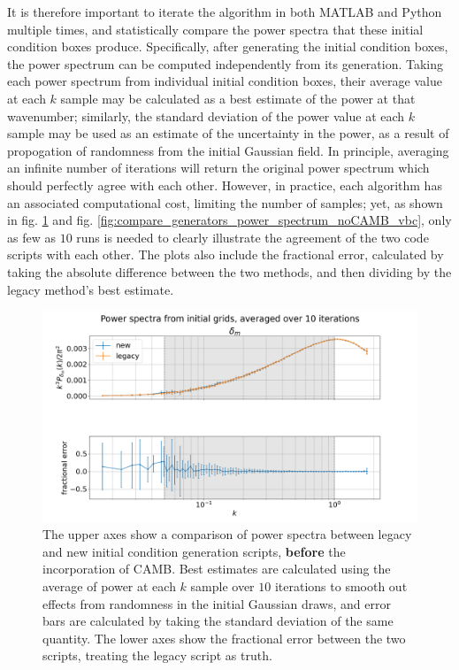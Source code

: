 \documentclass[floats,floatfix,showpacs,amssymb,prd,superscriptaddress,nofootinbib]{revtex4-2} %
\begin{document}
It is therefore important to iterate the algorithm in both MATLAB and Python multiple times, and statistically compare the power spectra that these initial condition boxes produce. Specifically, after generating the initial condition boxes, the power spectrum can be computed independently from its generation. Taking each power spectrum from individual initial condition boxes, their average value at each $k$ sample may be calculated as a best estimate of the power at that wavenumber; similarly, the standard deviation of the power value at each $k$ sample may be used as an estimate of the uncertainty in the power, as a result of propogation of randomness from the initial Gaussian field. In principle, averaging an infinite number of iterations will return the original power spectrum which should perfectly agree with each other. However, in practice, each algorithm has an associated computational cost, limiting the number of samples; yet, as shown in fig. \ref{fig:compare_generators_power_spectrum_noCAMB_delta_m} and fig. \ref{fig:compare_generators_power_spectrum_noCAMB_vbc}, only as few as $10$ runs is needed to clearly illustrate the agreement of the two code scripts with each other. The plots also include the fractional error, calculated by taking the absolute difference between the two methods, and then dividing by the legacy method's best estimate.

\newpage
\begin{figure}[H]
    \centering
    \includegraphics[width=0.9\columnwidth]{images/ic_power_spectra/compare_generators_averaged_power_spectra_with_residual_noCAMB_delta_m.png}
    \caption{The upper axes show a comparison of power spectra between legacy and new initial condition generation scripts, \textbf{before} the incorporation of CAMB. Best estimates are calculated using the average of power at each $k$ sample over $10$ iterations to smooth out effects from randomness in the initial Gaussian draws, and error bars are calculated by taking the standard deviation of the same quantity. The lower axes show the fractional error between the two scripts, treating the legacy script as truth.}
    \label{fig:compare_generators_power_spectrum_noCAMB_delta_m}
\end{figure}
\end{document}
